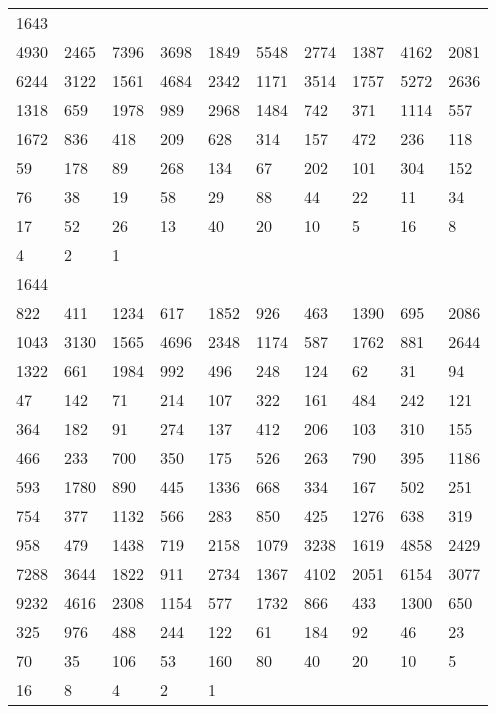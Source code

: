 \begin{longtable}{*{10}{l}}
1643&&&&&&&&&\\
4930& 2465& 7396& 3698& 1849& 5548& 2774& 1387& 4162& 2081\\
6244& 3122& 1561& 4684& 2342& 1171& 3514& 1757& 5272& 2636\\
1318& 659& 1978& 989& 2968& 1484& 742& 371& 1114& 557\\
1672& 836& 418& 209& 628& 314& 157& 472& 236& 118\\
59& 178& 89& 268& 134& 67& 202& 101& 304& 152\\
76& 38& 19& 58& 29& 88& 44& 22& 11& 34\\
17& 52& 26& 13& 40& 20& 10& 5& 16& 8\\
4& 2& 1& \\

1644&&&&&&&&&\\
822& 411& 1234& 617& 1852& 926& 463& 1390& 695& 2086\\
1043& 3130& 1565& 4696& 2348& 1174& 587& 1762& 881& 2644\\
1322& 661& 1984& 992& 496& 248& 124& 62& 31& 94\\
47& 142& 71& 214& 107& 322& 161& 484& 242& 121\\
364& 182& 91& 274& 137& 412& 206& 103& 310& 155\\
466& 233& 700& 350& 175& 526& 263& 790& 395& 1186\\
593& 1780& 890& 445& 1336& 668& 334& 167& 502& 251\\
754& 377& 1132& 566& 283& 850& 425& 1276& 638& 319\\
958& 479& 1438& 719& 2158& 1079& 3238& 1619& 4858& 2429\\
7288& 3644& 1822& 911& 2734& 1367& 4102& 2051& 6154& 3077\\
9232& 4616& 2308& 1154& 577& 1732& 866& 433& 1300& 650\\
325& 976& 488& 244& 122& 61& 184& 92& 46& 23\\
70& 35& 106& 53& 160& 80& 40& 20& 10& 5\\
16& 8& 4& 2& 1& \\


\end{longtable}
